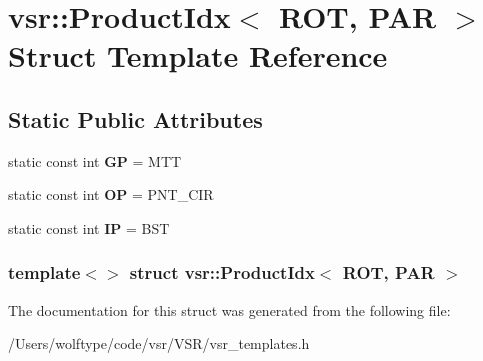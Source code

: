 \hypertarget{structvsr_1_1_product_idx_3_01_r_o_t_00_01_p_a_r_01_4}{\section{vsr\-:\-:Product\-Idx$<$ R\-O\-T, P\-A\-R $>$ Struct Template Reference}
\label{structvsr_1_1_product_idx_3_01_r_o_t_00_01_p_a_r_01_4}
}
\subsection*{Static Public Attributes}
\begin{DoxyCompactItemize}
\item 
\hypertarget{structvsr_1_1_product_idx_3_01_r_o_t_00_01_p_a_r_01_4_a55eb998e009b90fb3aa6e093e3a1db14}{static const int {\bfseries G\-P} = M\-T\-T}\label{structvsr_1_1_product_idx_3_01_r_o_t_00_01_p_a_r_01_4_a55eb998e009b90fb3aa6e093e3a1db14}

\item 
\hypertarget{structvsr_1_1_product_idx_3_01_r_o_t_00_01_p_a_r_01_4_aab02230e8f93f2c75872608b2a17760c}{static const int {\bfseries O\-P} = P\-N\-T\-\_\-\-C\-I\-R}\label{structvsr_1_1_product_idx_3_01_r_o_t_00_01_p_a_r_01_4_aab02230e8f93f2c75872608b2a17760c}

\item 
\hypertarget{structvsr_1_1_product_idx_3_01_r_o_t_00_01_p_a_r_01_4_a4065bce6aefab7dc55611b269ccd0f40}{static const int {\bfseries I\-P} = B\-S\-T}\label{structvsr_1_1_product_idx_3_01_r_o_t_00_01_p_a_r_01_4_a4065bce6aefab7dc55611b269ccd0f40}

\end{DoxyCompactItemize}
\subsubsection*{template$<$$>$ struct vsr\-::\-Product\-Idx$<$ R\-O\-T, P\-A\-R $>$}



The documentation for this struct was generated from the following file\-:\begin{DoxyCompactItemize}
\item 
/\-Users/wolftype/code/vsr/\-V\-S\-R/vsr\-\_\-templates.\-h\end{DoxyCompactItemize}
